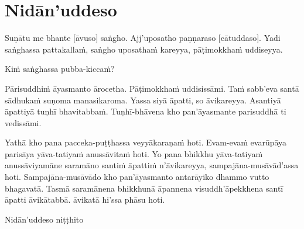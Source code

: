 \section{Nidān'uddeso}
\label{nidan'uddeso}

Suṇātu me bhante [āvuso] saṅgho. Ajj'uposatho paṇṇaraso [cātuddaso]. Yadi saṅghassa pattakallaṁ, saṅgho uposathaṁ kareyya, pāṭimokkhaṁ uddiseyya.

Kiṁ saṅghassa pubba-kiccaṁ?

Pārisuddhiṁ āyasmanto ārocetha. Pāṭimokkhaṁ uddisissāmi. Taṁ sabb'eva santā sādhukaṁ suṇoma manasikaroma. Yassa siyā āpatti, so āvikareyya. Asantiyā āpattiyā tuṇhī bhavitabbaṁ. Tuṇhī-bhāvena kho pan'āyasmante parisuddhā ti vedissāmi.

Yathā kho pana pacceka-puṭṭhassa veyyākaraṇaṁ hoti. Evam-evaṁ evarūpāya parisāya yāva-tatiyaṁ anussāvitaṁ hoti. Yo pana bhikkhu yāva-tatiyaṁ anussāviyamāne saramāno santiṁ āpattiṁ n'āvikareyya, sampajāna-musāvād'assa hoti. Sampajāna-musāvādo kho pan'āyasmanto antarāyiko dhammo vutto bhagavatā. Tasmā saramānena bhikkhunā āpannena visuddh'āpekkhena santī āpatti āvikātabbā. āvikatā hi'ssa phāsu hoti.

\medskip

\begin{outro}
  Nidān'uddeso niṭṭhito
\end{outro}

\clearpage
